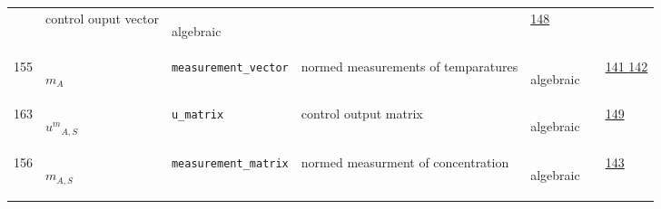 \begin{longtable}{|p{1cm}|p{2.5cm}|p{4.5cm}|p{8cm}|p{3.0cm}|p{3cm}|p{1cm}|}
             & control ouput vector
             & \begin{lay}algebraic \end{lay}
             & $  $
             &                 \hyperlink{"e:148"}{ 148 }
                 \\
            155
             & \hypertarget{"v:155"}{ $ {m}{_{A}} $}
             & \verb|measurement_vector|
             & normed measurements of temparatures
             & \begin{lay}algebraic \end{lay}
             & $  $
             &                 \hyperlink{"e:141"}{ 141 }
                                 \hyperlink{"e:142"}{ 142 }
                 \\
            163
             & \hypertarget{"v:163"}{ $ {{u^{m}}}{_{A, S}} $}
             & \verb|u_matrix|
             & control output matrix
             & \begin{lay}algebraic \end{lay}
             & $  $
             &                 \hyperlink{"e:149"}{ 149 }
                 \\
            156
             & \hypertarget{"v:156"}{ $ {m}{_{A, S}} $}
             & \verb|measurement_matrix|
             & normed measurment of concentration
             & \begin{lay}algebraic \end{lay}
             & $  $
             &                 \hyperlink{"e:143"}{ 143 }
                 \\
    \end{longtable}